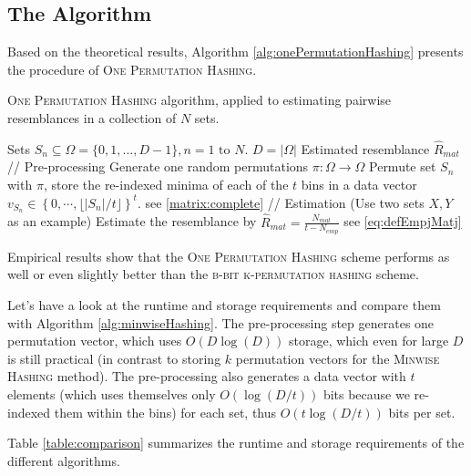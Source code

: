 \documentclass[a4paper]{article}
\begin{document}
\subsection{The Algorithm}

Based on the theoretical results, Algorithm \vref{alg:onePermutationHashing} presents the procedure of \textsc{One Permutation Hashing}.

\begin{algorithm}[H]
\caption{\textsc{One Permutation Hashing} algorithm, applied to estimating pairwise resemblances in a collection of $N$ sets.}
\label{alg:onePermutationHashing}
\begin{algorithmic}
\Require Sets $S_n \subseteq \Omega = \{0,1,\ldots,D-1\}, n = 1 \text{ to } N$. \Comment $D = \left| \Omega \right|$
\Ensure Estimated resemblance $\hat{R}_{mat}$
\State // Pre-processing
\State Generate one random permutations $\pi: \Omega\longrightarrow\Omega$
	\State Permute set $S_n$ with $\pi$, store the re-indexed minima of each of the $t$ bins in a data vector $v_{S_n} \in \left\lbrace 0,\cdots,\lfloor \left| S_n \right| / t \rfloor \right\rbrace ^t$. \Comment see \ref{matrix:complete}
\EndFor
\State
\State // Estimation (Use two sets $X,Y$ as an example)
\State Estimate the resemblance by $\hat{R}_{mat}=\frac{N_{mat}}{t-N_{emp}}$ \Comment see \ref{eq:defEmpjMatj}
\end{algorithmic}
\end{algorithm}

Empirical results show that the \textsc{One Permutation Hashing} scheme performs as well or even slightly better than the \textsc{b-bit k-permutation hashing} scheme.

Let's have a look at the runtime and storage requirements and compare them with Algorithm \vref{alg:minwiseHashing}. The pre-processing step generates one permutation vector, which uses $O(D\log(D))$ storage, which even for large $D$ is still practical (in contrast to storing $k$ permutation vectors for the \textsc{Minwise Hashing} method). The pre-processing also generates a data vector with $t$ elements (which uses themselves only $O(\log(D/t))$ bits because we re-indexed them within the bins) for each set, thus $O(t \log(D/t))$ bits per set.

Table \vref{table:comparison} summarizes the runtime and storage requirements of the different algorithms.
\end{document}
